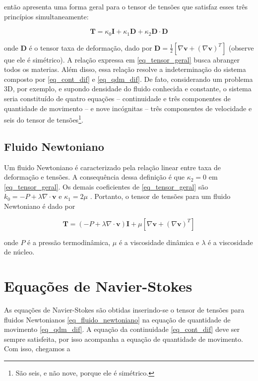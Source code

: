 \documentclass[a4paper,portuguese,10pt]{article}
\renewcommand{\div}{\nabla\cdot}
\newcommand{\grad}{\nabla}
\renewcommand{\vec}{\mathbf}
\begin{document}
\citet{SLATTERY99} então apresenta uma forma geral para o tensor de tensões que satisfaz esses três princípios simultaneamente:

\begin{equation}
  \vec{T} = \kappa_0\vec{I} + \kappa_1\vec{D} + \kappa_2\vec{D}\cdot\vec{D}
  \label{eq_tensor_geral}
\end{equation}

onde $\vec{D}$ é o tensor taxa de deformação, dado por $\vec{D} = \frac{1}{2}[\grad\vec{v} + (\grad\vec{v})^T]$ (observe que ele é simétrico). A relação expressa em \ref{eq_tensor_geral} busca abranger todos os materias. Além disso, essa relação resolve a indeterminação do sistema composto por \ref{eq_cont_dif} e \ref{eq_qdm_dif}. De fato, considerando um problema 3D, por exemplo, e supondo densidade do fluido conhecida e constante, o sistema seria constituído de quatro equações -- continuidade e três componentes de quantidade de movimento -- e nove incógnitas -- três componentes de velocidade e seis do tensor de tensões\footnote{São seis, e não nove, porque ele é simétrico.}.

\subsection{Fluido Newtoniano}

Um fluido Newtoniano é caracterizado pela relação linear entre taxa de deformação e tensões. A consequência dessa definição é que $\kappa_2=0$ em \ref{eq_tensor_geral}. Os demais coeficientes de \ref{eq_tensor_geral} são $k_0=-P+\lambda\div\vec{v}$ e $\kappa_1=2\mu$ \cite{SLATTERY99}. Portanto, o tensor de tensões para um fluido Newtoniano é dado por

\begin{equation}
  \vec{T} = (-P+\lambda\div\vec{v})\vec{I} + \mu[\grad\vec{v} + (\grad\vec{v})^T]
  \label{eq_fluido_newtoniano}
\end{equation}

onde $P$ é a pressão termodinâmica, $\mu$ é a viscosidade dinâmica e $\lambda$ é a viscosidade de núcleo.

\section{\label{sec:n-s}Equações de Navier-Stokes}

As equações de Navier-Stokes são obtidas inserindo-se o tensor de tensões para fluidos Newtonianos \ref{eq_fluido_newtoniano} na equação de quantidade de movimento \ref{eq_qdm_dif}. A equação da continuidade \ref{eq_cont_dif} deve ser sempre satisfeita, por isso acompanha a equação de quantidade de movimento. Com isso, chegamos a
\end{document}
